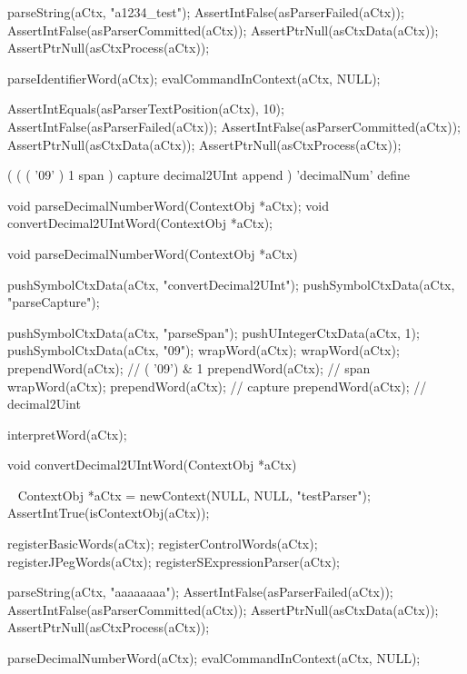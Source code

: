 \startCTest
  parseString(aCtx, "a1234_test");
  AssertIntFalse(asParserFailed(aCtx));
  AssertIntFalse(asParserCommitted(aCtx));
  AssertPtrNull(asCtxData(aCtx));
  AssertPtrNull(asCtxProcess(aCtx));
  
  parseIdentifierWord(aCtx);
  evalCommandInContext(aCtx, NULL);
  
  AssertIntEquals(asParserTextPosition(aCtx), 10);
  AssertIntFalse(asParserFailed(aCtx));
  AssertIntFalse(asParserCommitted(aCtx));
  AssertPtrNull(asCtxData(aCtx));
  AssertPtrNull(asCtxProcess(aCtx));
\stopCTest
\stopTestCase
\stopTestSuite

\startTestSuite[parseDecimalNumberWord]

\starttyping
(
  (
    ( '09' ) 1 span
  ) capture decimal2UInt append
) 'decimalNum' define
\stoptyping

\startCHeader
void parseDecimalNumberWord(ContextObj *aCtx);
void convertDecimal2UIntWord(ContextObj *aCtx);
\stopCHeader

\startCCode
void parseDecimalNumberWord(ContextObj *aCtx) {

  pushSymbolCtxData(aCtx, "convertDecimal2UInt");
  pushSymbolCtxData(aCtx, "parseCapture");
  
  pushSymbolCtxData(aCtx, "parseSpan");
  pushUIntegerCtxData(aCtx, 1);
  pushSymbolCtxData(aCtx, "09");
  wrapWord(aCtx);
  wrapWord(aCtx);
  prependWord(aCtx); // ( '09') & 1
  prependWord(aCtx); // span
  wrapWord(aCtx);
  prependWord(aCtx); // capture
  prependWord(aCtx); // decimal2Uint
  
  interpretWord(aCtx);
}

void convertDecimal2UIntWord(ContextObj *aCtx) {
  
}
\stopCCode

\CTestsSuiteSetup\
\startCTest
  ContextObj *aCtx = newContext(NULL, NULL, "testParser");
  AssertIntTrue(isContextObj(aCtx));
  
  registerBasicWords(aCtx);
  registerControlWords(aCtx);
  registerJPegWords(aCtx);
  registerSExpressionParser(aCtx);
\stopCTest

\startCTest
  parseString(aCtx, "aaaaaaaa");
  AssertIntFalse(asParserFailed(aCtx));
  AssertIntFalse(asParserCommitted(aCtx));
  AssertPtrNull(asCtxData(aCtx));
  AssertPtrNull(asCtxProcess(aCtx));
  
  parseDecimalNumberWord(aCtx);
  evalCommandInContext(aCtx, NULL);
  
